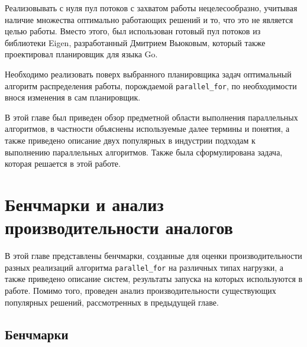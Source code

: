 \documentclass[times,specification,annotation]{itmo-student-thesis}
\begin{document}
Реализовывать с нуля пул потоков с захватом работы нецелесообразно, учитывая наличие множества оптимально работающих решений и то, что это не является целью работы. Вместо этого, был использован готовый пул потоков из библиотеки Eigen, разработанный Дмитрием Вьюковым, который также проектировал планировщик для языка Go.

Необходимо реализовать поверх выбранного планировщика задач оптимальный алгоритм распределения работы, порождаемой \texttt{parallel\_for}, по необходимости внося изменения в сам планировщик.

\chapterconclusion 
В этой главе был приведен обзор предметной области выполнения параллельных алгоритмов, в частности объяснены используемые далее термины и понятия, а также приведено описание двух популярных в индустрии подходам к выполнению параллельных алгоритмов. Также была сформулирована задача, которая решается в этой работе.

\chapter{Бенчмарки и анализ производительности аналогов}
В этой главе представлены бенчмарки, созданные для оценки производительности разных реализаций алгоритма \texttt{parallel\_for} на различных типах нагрузки, а также приведено описание систем, результаты запуска на которых используются в работе. Помимо того, проведен анализ производительности существующих популярных решений, рассмотренных в предыдущей главе.

\section{Бенчмарки}
\end{document}
